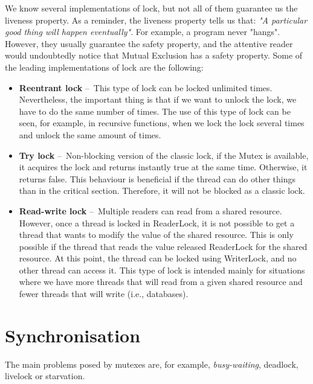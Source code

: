 We know several implementations of lock, but not all of them guarantee us the liveness property.
As a reminder, the liveness property tells us that: \emph{"A particular good thing will happen eventually"}.
For example, a program never "hangs".
However, they usually guarantee the safety property, and the attentive reader would undoubtedly notice that Mutual Exclusion has a safety property.
Some of the leading implementations of lock are the following:
\begin {itemize}
    \item \textbf{Reentrant lock} \---\ This type of lock can be locked unlimited times.
    Nevertheless, the important thing is that if we want to unlock the lock, we have to do the same number of times.
    The use of this type of lock can be seen, for example, in recursive functions, when we lock the lock several times and unlock the same amount of times.
    \item \textbf{Try lock} \---\ Non-blocking version of the classic lock, if the Mutex is available, it acquires the lock and returns instantly true at the same time.
    Otherwise, it returns false.
    This behaviour is beneficial if the thread can do other things than in the critical section. Therefore, it will not be blocked as a classic lock.
    \item \textbf{Read-write lock} \---\ Multiple readers can read from a shared resource.
    However, once a thread is locked in ReaderLock, it is not possible to get a thread that wants to modify the value of the shared resource.
    This is only possible if the thread that reads the value released ReaderLock for the shared resource.
    At this point, the thread can be locked using WriterLock, and no other thread can access it.
    This type of lock is intended mainly for situations where we have more threads that will read from a given shared resource and fewer threads that will write (i.e., databases).
\end{itemize}

\section{Synchronisation}
\label{04:synchronization}

The main problems posed by mutexes are, for example, \emph {busy-waiting}, deadlock, livelock or starvation.

